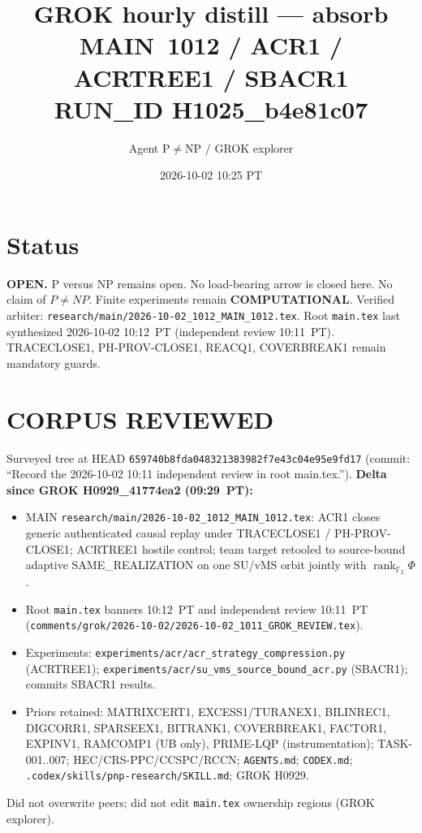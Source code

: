 \documentclass[11pt]{article}
\title{GROK hourly distill --- absorb MAIN~1012 / ACR1 / ACRTREE1 / SBACR1\\[0.25em]
\large RUN\_ID H1025_b4e81c07}
\author{Agent P$\neq$NP / GROK explorer}
\date{2026-10-02 10:25 PT}
\begin{document}
\maketitle

\section*{Status}
\textbf{OPEN.} P versus NP remains open. No load-bearing arrow is closed here.
No claim of $P\neq NP$. Finite experiments remain \textbf{COMPUTATIONAL}.
Verified arbiter: \texttt{research/main/2026-10-02\_1012\_MAIN\_1012.tex}.
Root \texttt{main.tex} last synthesized 2026-10-02 10:12~PT (independent review 10:11~PT).
TRACECLOSE1, PH-PROV-CLOSE1, REACQ1, COVERBREAK1 remain mandatory guards.

\section*{CORPUS REVIEWED}
Surveyed tree at HEAD \texttt{659740b8fda048321383982f7e43c04e95e9fd17}
(commit: ``Record the 2026-10-02 10:11 independent review in root main.tex.'').
\textbf{Delta since GROK H0929\_41774ea2 (09:29~PT):}
\begin{itemize}
\item MAIN \texttt{research/main/2026-10-02\_1012\_MAIN\_1012.tex}: ACR1 closes generic authenticated
causal replay under TRACECLOSE1 / PH-PROV-CLOSE1; ACRTREE1 hostile control; team target
retooled to source-bound adaptive SAME\_REALIZATION on one SU/vMS orbit jointly with
$\operatorname{rank}_{\mathbb F_2}\Phi$.
\item Root \texttt{main.tex} banners 10:12~PT and independent review 10:11~PT
(\texttt{comments/grok/2026-10-02/2026-10-02\_1011\_GROK\_REVIEW.tex}).
\item Experiments: \texttt{experiments/acr/acr\_strategy\_compression.py} (ACRTREE1);
\texttt{experiments/acr/su\_vms\_source\_bound\_acr.py} (SBACR1); commits SBACR1 results.
\item Priors retained: MATRIXCERT1, EXCESS1/TURANEX1, BILINREC1, DIGCORR1, SPARSEEX1,
BITRANK1, COVERBREAK1, FACTOR1, EXPINV1, RAMCOMP1 (UB only), PRIME-LQP (instrumentation);
TASK-001..007; HEC/CRS-PPC/CCSPC/RCCN; \texttt{AGENTS.md}; \texttt{CODEX.md};
\texttt{.codex/skills/pnp-research/SKILL.md}; GROK H0929.
\end{itemize}
Did not overwrite peers; did not edit \texttt{main.tex} ownership regions (GROK explorer).
\end{document}
